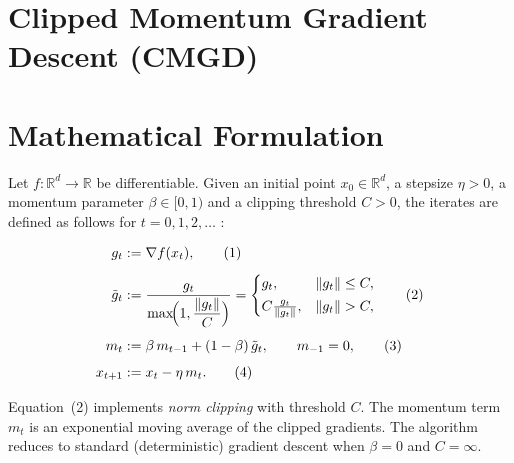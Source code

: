 \documentclass{article}
\newcommand{\norm}[1]{\left\lVert#1\right\rVert}
\begin{document}
\section*{Clipped Momentum Gradient Descent (CMGD)}

\section*{Mathematical Formulation}
Let $f:\mathbb{R}^{d}\rightarrow\mathbb{R}$ be differentiable.  
Given an initial point $x_{0}\in\mathbb{R}^{d}$, a stepsize $\eta>0$, a momentum
parameter $\beta\in[0,1)$ and a clipping threshold $C>0$, the iterates are defined
as follows for $t=0,1,2,\dots$ :

\begin{align}
g_{t} &:= \nabla f(x_{t}) , \tag{1}\\[4pt]
\tilde g_{t} &:= \frac{g_{t}}{\displaystyle \max\!\Bigl(1,\frac{\norm{g_{t}}}{C}\Bigr)} 
            = 
            \begin{cases}
                g_{t}, & \norm{g_{t}}\le C,\\[2pt]
                C\frac{g_{t}}{\norm{g_{t}}}, & \norm{g_{t}}> C,
            \end{cases}\tag{2}\\[4pt]
m_{t} &:= \beta\, m_{t-1} + (1-\beta)\,\tilde g_{t}, \qquad m_{-1}=0, \tag{3}\\[4pt]
x_{t+1} &:= x_{t} - \eta\, m_{t}. \tag{4}
\end{align}

Equation~(2) implements \emph{norm clipping} with threshold $C$.  
The momentum term $m_{t}$ is an exponential moving average of the clipped
gradients.  The algorithm reduces to standard (deterministic) gradient descent
when $\beta=0$ and $C=\infty$.
\end{document}
